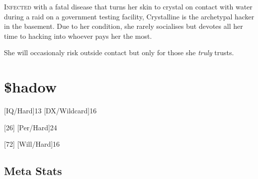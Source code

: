 \documentclass[a4paper,onepage]{memoir}
\begin{document}
\begin{npcdescription}
  \lettrine{I}{nfected} with a fatal disease that turns her skin to crystal on
  contact with water during a raid on a government testing facility, Crystalline
  is the archetypal hacker in the basement. Due to her condition, she rarely
  socialises but devotes all her time to hacking into whoever pays her the most.

  She will occasionaly risk outside contact but only for those she \emph{truly}
  trusts.
\end{npcdescription}



\section{\$hadow}

\begin{character*}[shadow]
     

  [IQ/Hard]{13}
  [DX/Wildcard]{16} %

  [26]
  [Per/Hard]{24}

  [72]
  [Will/Hard]{16}
\end{character*}


\subsection{Meta Stats}
\end{document}
